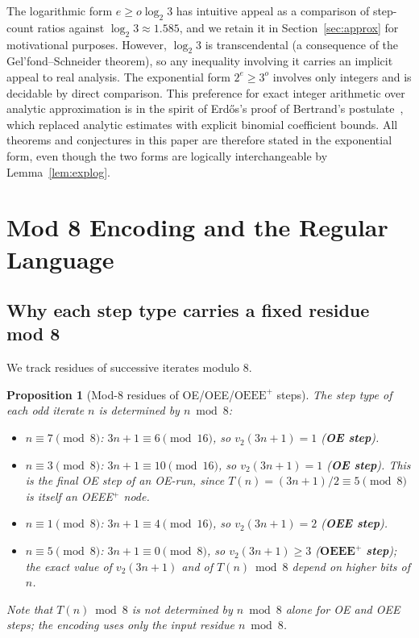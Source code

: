 \documentclass[11pt]{article}
\newtheorem{proposition}{Proposition}
\begin{document}
\noindent The logarithmic form $e \geq o\log_2 3$ has intuitive appeal as
a comparison of step-count ratios against $\log_2 3 \approx 1.585$, and
we retain it in Section~\ref{sec:approx} for motivational purposes.
However, $\log_2 3$ is transcendental (a consequence of the
Gel'fond--Schneider theorem), so any inequality involving it carries an
implicit appeal to real analysis.  The exponential form $2^e \geq 3^o$
involves only integers and is decidable by direct comparison.  This
preference for exact integer arithmetic over analytic approximation is
in the spirit of Erd\H{o}s's proof of Bertrand's postulate~\cite{erdos1932},
which replaced analytic estimates with explicit binomial coefficient
bounds.  All theorems and conjectures in this paper are therefore stated
in the exponential form, even though the two forms are logically
interchangeable by Lemma~\ref{lem:explog}.

\section{Mod 8 Encoding and the Regular Language}

\subsection{Why each step type carries a fixed residue mod 8}

We track residues of successive iterates modulo 8.

\begin{proposition}[Mod-8 residues of OE/OEE/$\mathrm{OEEE}^+$ steps]
\label{prop:mod8}
The step type of each odd iterate $n$ is determined by $n \bmod 8$:
\begin{itemize}
  \item $n \equiv 7 \pmod 8$: $3n+1 \equiv 6 \pmod{16}$, so
        $v_2(3n+1) = 1$ (\textbf{OE step}).
  \item $n \equiv 3 \pmod 8$: $3n+1 \equiv 10 \pmod{16}$, so
        $v_2(3n+1) = 1$ (\textbf{OE step}).  This is the \emph{final} OE
        step of an OE-run, since $T(n) = (3n+1)/2 \equiv 5\pmod{8}$ is
        itself an OEEE$^+$ node.
  \item $n \equiv 1 \pmod 8$: $3n+1 \equiv 4 \pmod{16}$, so
        $v_2(3n+1) = 2$ (\textbf{OEE step}).
  \item $n \equiv 5 \pmod 8$: $3n+1 \equiv 0 \pmod{8}$, so
        $v_2(3n+1) \geq 3$ ($\mathbf{OEEE}^+$ \textbf{step}); the exact
        value of $v_2(3n+1)$ and of $T(n) \bmod 8$ depend on higher bits
        of $n$.
\end{itemize}
Note that $T(n) \bmod 8$ is \emph{not} determined by $n \bmod 8$ alone for
OE and OEE steps; the encoding uses only the \emph{input} residue $n\bmod 8$.
\end{proposition}
\end{document}
